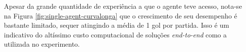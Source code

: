 Apesar da grande quantidade de experiência a que o agente teve acesso, nota-se na Figura \ref{fig:single-agent-curvalonga} que o crescimento de seu desempenho é bastante limitado, sequer atingindo a média de 1 gol por partida. Isso é um indicativo do altíssimo custo computacional de soluções \textit{end-to-end} como a utilizada no experimento.




 


